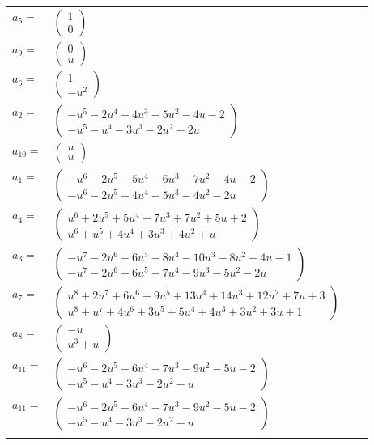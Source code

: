 \documentclass[1p]{elsarticle_modified}
\theoremstyle{definition}
\begin{document}
\begin{tabular}{m{7pt} m{180pt} m{7pt} m{180pt} }
\flushright $a_{5}=$&$\begin{pmatrix}1\\0\end{pmatrix}$ \\
\flushright $a_{9}=$&$\begin{pmatrix}0\\u\end{pmatrix}$ \\
\flushright $a_{6}=$&$\begin{pmatrix}1\\- u^2\end{pmatrix}$ \\
\flushright $a_{2}=$&$\begin{pmatrix}- u^5-2 u^4-4 u^3-5 u^2-4 u-2\\- u^5- u^4-3 u^3-2 u^2-2 u\end{pmatrix}$ \\
\flushright $a_{10}=$&$\begin{pmatrix}u\\u\end{pmatrix}$ \\
\flushright $a_{1}=$&$\begin{pmatrix}- u^6-2 u^5-5 u^4-6 u^3-7 u^2-4 u-2\\- u^6-2 u^5-4 u^4-5 u^3-4 u^2-2 u\end{pmatrix}$ \\
\flushright $a_{4}=$&$\begin{pmatrix}u^6+2 u^5+5 u^4+7 u^3+7 u^2+5 u+2\\u^6+u^5+4 u^4+3 u^3+4 u^2+u\end{pmatrix}$ \\
\flushright $a_{3}=$&$\begin{pmatrix}- u^7-2 u^6-6 u^5-8 u^4-10 u^3-8 u^2-4 u-1\\- u^7-2 u^6-6 u^5-7 u^4-9 u^3-5 u^2-2 u\end{pmatrix}$ \\
\flushright $a_{7}=$&$\begin{pmatrix}u^8+2 u^7+6 u^6+9 u^5+13 u^4+14 u^3+12 u^2+7 u+3\\u^8+u^7+4 u^6+3 u^5+5 u^4+4 u^3+3 u^2+3 u+1\end{pmatrix}$ \\
\flushright $a_{8}=$&$\begin{pmatrix}- u\\u^3+u\end{pmatrix}$ \\
\flushright $a_{11}=$&$\begin{pmatrix}- u^6-2 u^5-6 u^4-7 u^3-9 u^2-5 u-2\\- u^5- u^4-3 u^3-2 u^2- u\end{pmatrix}$\\ \flushright $a_{11}=$&$\begin{pmatrix}- u^6-2 u^5-6 u^4-7 u^3-9 u^2-5 u-2\\- u^5- u^4-3 u^3-2 u^2- u\end{pmatrix}$\\&\end{tabular}
\end{document}
